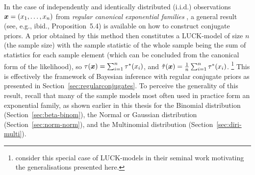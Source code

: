 \begin{example}
\label{ex:jstp-1}
In the case of independently and identically
distributed (i.i.d.) observations ${\bm x} = (x_1,\ldots, x_n)$ from
\emph{regular canonical exponential families} \parencite[p.~202 and p.~272f]{2000:bernardosmith},
a general result (see, e.g., ibid., Proposition~5.4) is available on how
to construct conjugate priors. A prior obtained by this method then
constitutes a LUCK-model of size $n$ (the sample size)
with the sample statistic of the whole sample being the sum of
statistics for each sample element (which can be concluded from the
canonical form of the likelihood), so $\tau({\bm x}) = \sum_{i=1}^n \tau^*(x_i)$,
and $\tilde{\tau}({\bm x}) = \frac{1}{n}\sum_{i=1}^n \tau^*(x_i)$.%
\footnote{\textcite{2005:quaeghebeurcooman} consider this special case of LUCK-models in
their seminal work motivating the generalisations presented here.}
This is effectively the framework of Bayesian inference with regular conjugate priors
as presented in Section~\ref{sec:regularconjugates}.
To perceive the generality of this result, recall that many of the
sample models most often used in practice form an exponential family,
as shown earlier in this thesis
for the Binomial distribution (Section~\ref{sec:beta-binom}),
the Normal or Gaussian distribution (Section~\ref{sec:norm-norm}),
and the Multinomial distribution (Section~\ref{sec:diri-multi}).
\end{example}

